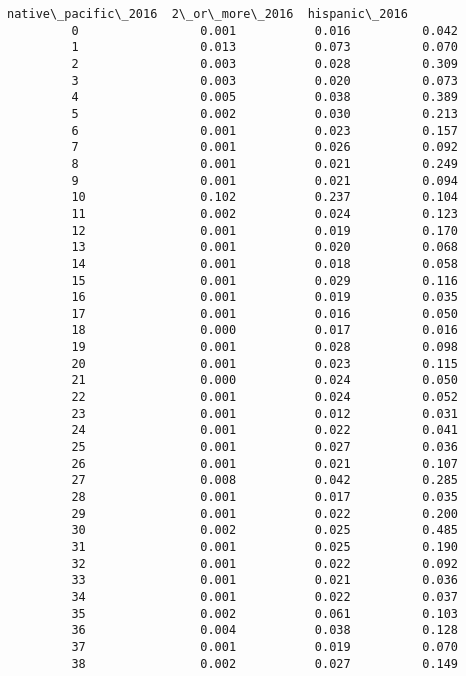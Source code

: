 \documentclass[11pt]{article}
\begin{document}
\begin{Verbatim}[commandchars=\\\{\}]
             native\_pacific\_2016  2\_or\_more\_2016  hispanic\_2016  
         0                 0.001           0.016          0.042  
         1                 0.013           0.073          0.070  
         2                 0.003           0.028          0.309  
         3                 0.003           0.020          0.073  
         4                 0.005           0.038          0.389  
         5                 0.002           0.030          0.213  
         6                 0.001           0.023          0.157  
         7                 0.001           0.026          0.092  
         8                 0.001           0.021          0.249  
         9                 0.001           0.021          0.094  
         10                0.102           0.237          0.104  
         11                0.002           0.024          0.123  
         12                0.001           0.019          0.170  
         13                0.001           0.020          0.068  
         14                0.001           0.018          0.058  
         15                0.001           0.029          0.116  
         16                0.001           0.019          0.035  
         17                0.001           0.016          0.050  
         18                0.000           0.017          0.016  
         19                0.001           0.028          0.098  
         20                0.001           0.023          0.115  
         21                0.000           0.024          0.050  
         22                0.001           0.024          0.052  
         23                0.001           0.012          0.031  
         24                0.001           0.022          0.041  
         25                0.001           0.027          0.036  
         26                0.001           0.021          0.107  
         27                0.008           0.042          0.285  
         28                0.001           0.017          0.035  
         29                0.001           0.022          0.200  
         30                0.002           0.025          0.485  
         31                0.001           0.025          0.190  
         32                0.001           0.022          0.092  
         33                0.001           0.021          0.036  
         34                0.001           0.022          0.037  
         35                0.002           0.061          0.103  
         36                0.004           0.038          0.128  
         37                0.001           0.019          0.070  
         38                0.002           0.027          0.149  

\end{Verbatim}
\end{document}
